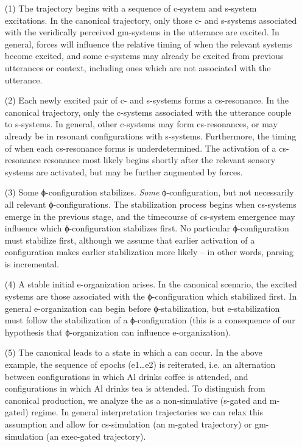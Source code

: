 \begin{enumerate}
\item[(1)]
The trajectory begins with a sequence of c-system and s-system excitations. In the canonical trajectory, only those c- and s-systems associated with the veridically perceived gm-systems in the utterance are excited. In general,  forces will influence the relative timing of when the relevant systems become excited, and some c-systems may already be excited from previous utterances or context, including ones which are not associated with the utterance. 
\item[(2)]
Each newly excited pair of c- and s-systems forms a cs-resonance. In the canonical trajectory, only the c-systems associated with the utterance couple to s-systems. In general, other c-systems may form cs-resonances, or may already be in resonant configurations with s-systems. Furthermore, the timing of when each cs-resonance forms is underdetermined. The activation of a cs-resonance resonance most likely begins shortly after the relevant sensory systems are activated, but may be further augmented by  forces.
\item[(3)]
Some ϕ-configuration stabilizes. \textit{Some} ϕ-configuration, but not necessarily all relevant ϕ-configurations. The stabilization process begins when cs-systems emerge in the previous stage, and the timecourse of cs-system emergence may influence which ϕ-configuration stabilizes first. No particular ϕ-configuration must stabilize first, although we assume that earlier activation of a configuration makes earlier stabilization more likely -- in other words, parsing is incremental. 
\item[(4)]
A stable initial e-organization arises. In the canonical scenario, the excited systems are those associated with the ϕ-configuration which stabilized first. In general e-organization can begin before ϕ-stabilization, but e-stabilization must follow the stabilization of a ϕ-configuration (this is a consequence of our hypothesis that ϕ-organization can influence e-organization). 
\item[(5)]
The canonical  leads to a state in which a  can occur. In the above example, the sequence of epochs (e1…e2) is reiterated, i.e. an alternation between configurations in which {\textbar}Al drinks coffee{\textbar} is attended, and configurations in which {\textbar}Al drinks tea{\textbar} is attended. To distinguish  from canonical production, we analyze the  as a non-simulative (s-gated and m-gated) regime. In general interpretation trajectories we can relax this assumption and allow for cs-simulation (an m-gated trajectory) or gm-simulation (an exec-gated trajectory).
\end{enumerate}

